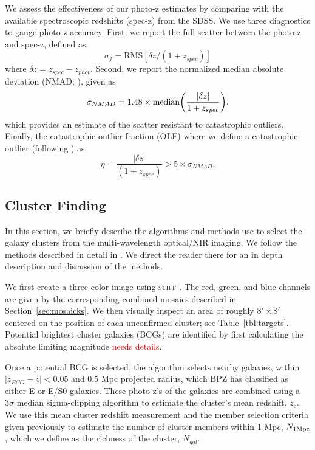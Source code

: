 \documentclass[apj, revtex4]{emulateapj}
\newcommand{\editorial}[1]{\textcolor{red}{#1}}
\begin{document}
We assess the effectiveness of our photo-z estimates by comparing with the available spectroscopic redshifts (spec-z) from the SDSS. We use three diagnostics to gauge photo-z accuracy. First, we report the full scatter between the photo-z and spec-z, defined as:
\begin{equation}
	\sigma_f = \mathrm{RMS}[\delta z/(1+z_{spec})]
\end{equation}
where $\delta z = z_{spec} - z_{phot}$. Second, we report the normalized median absolute deviation (NMAD; \citealt{Ilbert2009, Dahlen2013, Molino2017}), given as
\begin{equation}
	\sigma_{NMAD} = 1.48 \times \mathrm{median} \bigg{(} \frac{|\delta z|}{1+z_{spec}} \bigg{)}.
\end{equation}   
which provides an estimate of the scatter resistant to catastrophic outliers. Finally, the catastrophic outlier fraction (OLF) where we define a catastrophic outlier (following \citealt{Molino2017}) as,
\begin{equation}
	\eta = \frac{|\delta z|}{(1+z_{spec})} > 5 \times \sigma_{NMAD}.
\end{equation}

\subsection{Cluster Finding}
In this section, we briefly describe the algorithms and methods use to select the galaxy clusters from the multi-wavelength optical/NIR imaging. We follow the methods described in detail in \cite{Menanteau2009a, Menanteau2010}. We direct the reader there for an in depth description and discussion of the methods.  

We first create a three-color image using \textsc{stiff} \citep{Bertin2011}. The red, green, and blue channels are given by the corresponding combined mosaics described in Section~\ref{sec:mosaicks}. We then visually inspect an area of roughly $8' \times 8'$ centered on the position of each unconfirmed cluster; see Table~\ref{tbl:targets}. Potential brightest cluster galaxies (BCGs) are identified by first calculating the absolute limiting magnitude \editorial{needs details}.

Once a potential BCG is selected, the algorithm selects nearby galaxies, within $|z_{BCG} - z| < 0.05$ and 0.5 Mpc projected radius, which BPZ has classified as either E or E/S0 galaxies. These photo-z's of the galaxies are combined using a $3\sigma$ median sigma-clipping algorithm to estimate the cluster's mean redshift, $z_c$. We use this mean cluster redshift measurement and the member selection criteria given previously to estimate the number of cluster members within 1 Mpc, $N_{1\rm Mpc}$, which we define as the richness of the cluster, $N_{gal}$.   
\end{document}
